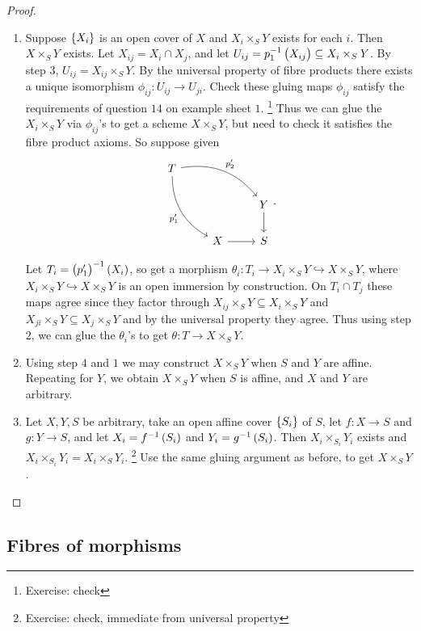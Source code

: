 \begin{proof}
\begin{enumerate}[leftmargin=0.5in, label=Step \arabic*.]
\item Suppose $ \cbr{X_i} $ is an open cover of $ X $ and $ X_i \times_S Y $ exists for each $ i $. Then $ X \times_S Y $ exists. Let $ X_{ij} = X_i \cap X_j $, and let $ U_{ij} = p_1^{-1}\br{X_{ij}} \subseteq X_i \times_S Y $. By step $ 3 $, $ U_{ij} = X_{ij} \times_S Y $. By the universal property of fibre products there exists a unique isomorphism $ \phi_{ij} : U_{ij} \to U_{ji} $. Check these gluing maps $ \phi_{ij} $ satisfy the requirements of question $ 14 $ on example sheet $ 1 $. \footnote{Exercise: check} Thus we can glue the $ X_i \times_S Y $ via $ \phi_{ij} $'s to get a scheme $ X \times_S Y $, but need to check it satisfies the fibre product axioms. So suppose given
$$
\begin{tikzcd}
T \arrow[bend left=30]{drr}{p_2'} \arrow[bend right=30]{ddr}[swap]{p_1'} & & \\
& & Y \arrow{d} \\
& X \arrow{r} & S
\end{tikzcd}.
$$

\pagebreak

Let $ T_i = \br{p_1'}^{-1}\br{X_i} $, so get a morphism $ \theta_i : T_i \to X_i \times_S Y \hookrightarrow X \times_S Y $, where $ X_i \times_S Y \hookrightarrow X \times_S Y $ is an open immersion by construction. On $ T_i \cap T_j $ these maps agree since they factor through $ X_{ij} \times_S Y \subseteq X_i \times_S Y $ and $ X_{ji} \times_S Y \subseteq X_j \times_S Y $ and by the universal property they agree. Thus using step $ 2 $, we can glue the $ \theta_i $'s to get $ \theta : T \to X \times_S Y $.
\item Using step $ 4 $ and $ 1 $ we may construct $ X \times_S Y $ when $ S $ and $ Y $ are affine. Repeating for $ Y $, we obtain $ X \times_S Y $ when $ S $ is affine, and $ X $ and $ Y $ are arbitrary.
\item Let $ X, Y, S $ be arbitrary, take an open affine cover $ \cbr{S_i} $ of $ S $, let $ f : X \to S $ and $ g : Y \to S $, and let $ X_i = f^{-1}\br{S_i} $ and $ Y_i = g^{-1}\br{S_i} $. Then $ X_i \times_{S_i} Y_i $ exists and $ X_i \times_{S_i} Y_i = X_i \times_S Y_i $. \footnote{Exercise: check, immediate from universal property} Use the same gluing argument as before, to get $ X \times_S Y $.
\end{enumerate}
\end{proof}

\subsection{Fibres of morphisms}

